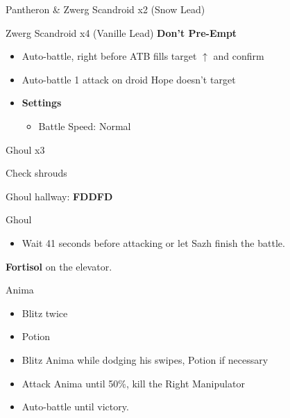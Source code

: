 	\begin{battle}[0:14]{Pantheron \& Zwerg Scandroid x2 (Snow Lead)}
	\end{battle}

	\begin{battle}[0:12]{Zwerg Scandroid x4 (Vanille Lead) \textbf{Don't Pre-Empt}}
		\begin{itemize}
			\item Auto-battle, right before ATB fills target $\uparrow$ and confirm
			\item Auto-battle 1 attack on droid Hope doesn't target
		\end{itemize}
	\end{battle}

	\begin{menu}
		\begin{itemize}
			\item \textbf{Settings}
			      \begin{itemize}
				      \item Battle Speed: Normal
			      \end{itemize}
		\end{itemize}
	\end{menu}

	\begin{battle}[0:12]{Ghoul x3}
	\end{battle}

	Check shrouds

	Ghoul hallway: {\bf FDDFD}

	\begin{battle}[0:41]{Ghoul}
		\begin{itemize}
			\item Wait 41 seconds before attacking or let Sazh finish the battle.
		\end{itemize}
	\end{battle}

	\textbf{Fortisol} on the elevator.

	\begin{battle}[0:54]{Anima}

		\begin{itemize}
			\item Blitz twice
			\item Potion
			\item Blitz Anima while dodging his swipes, Potion if necessary
			\item Attack Anima until 50\%, kill the Right Manipulator
			\item Auto-battle until victory.
		\end{itemize}
	\end{battle}


	\vfill
	\ 
	\columnbreak

